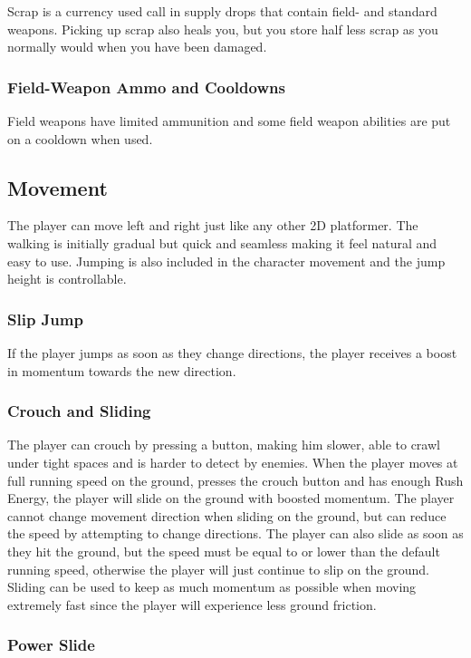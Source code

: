 \documentclass[12pt]{article}
\begin{document}
Scrap is a currency used call in supply drops that contain field- and standard weapons. Picking up scrap also heals you, but you store half  less scrap as you normally would when you have been damaged. 

\subsubsection{Field-Weapon Ammo and Cooldowns}

Field weapons have limited ammunition and some field weapon abilities are put on a cooldown when used. 

\subsection{Movement}

The player can move left and right just like any other 2D platformer. The walking is initially gradual but quick and seamless making it feel natural and easy to use. Jumping is also included in the character movement and the jump height is controllable.

\subsubsection{Slip Jump}

If the player jumps as soon as they change directions, the player receives a boost in momentum towards the new direction.

\subsubsection{Crouch and Sliding}

The player can crouch by pressing a button, making him slower, able to crawl under tight spaces and is harder to detect by enemies. When the player moves at full running speed on the ground, presses the crouch button and has enough Rush Energy, the player will slide on the ground with boosted momentum. The player cannot change movement direction when sliding on the ground, but can reduce the speed by attempting to change directions. The player can also slide as soon as they hit the ground, but the speed must be equal to or lower than the default running speed, otherwise the player will just continue to slip on the ground. Sliding can be used to keep as much momentum as possible when moving extremely fast since the player will experience less ground friction. 

\subsubsection{Power Slide}
\end{document}
